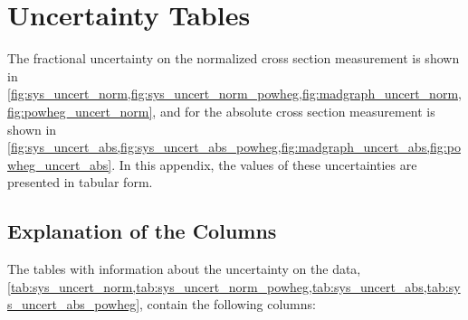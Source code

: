 \chapter{Uncertainty Tables}
\label{app:uncertainty_tables}

The fractional uncertainty on the normalized cross section measurement is shown
in
\cref{fig:sys_uncert_norm,fig:sys_uncert_norm_powheg,fig:madgraph_uncert_norm,fig:powheg_uncert_norm},
and for the absolute cross section measurement is shown in
\cref{fig:sys_uncert_abs,fig:sys_uncert_abs_powheg,fig:madgraph_uncert_abs,fig:powheg_uncert_abs}.
In this appendix, the values of these uncertainties are presented in tabular
form.

\section{Explanation of the Columns}

The tables with information about the uncertainty on the data,
\cref{tab:sys_uncert_norm,tab:sys_uncert_norm_powheg,tab:sys_uncert_abs,tab:sys_uncert_abs_powheg},
contain the following columns:

